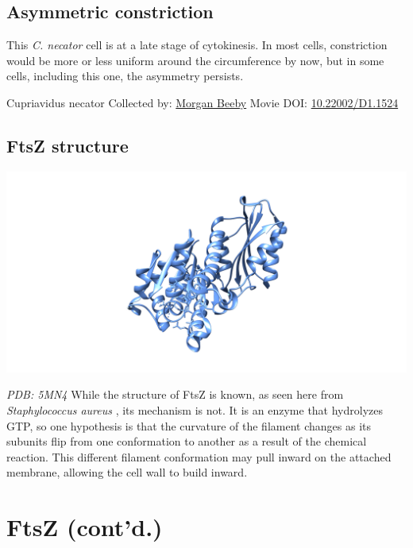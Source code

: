 \documentclass[]{tufte-book}
\begin{document}
\hypertarget{Asymmetric_constriction}{%
\subsection{Asymmetric constriction}\label{Asymmetric_constriction}}

This \emph{C. necator} cell is at a late stage of cytokinesis. In most cells, constriction would be more or less uniform around the circumference by now, but in some cells, including this one, the asymmetry persists.



\hypertarget{htmlwidget-9a9023a9fe3648c17818}{}

\label{fig:5-9a}Cupriavidus necator Collected by: \protect\hyperlink{morgan_beeby}{Morgan Beeby} Movie DOI: \href{https://doi.org/10.22002/D1.1524}{10.22002/D1.1524}

\hypertarget{FtsZ_structure}{%
\subsection{FtsZ structure}\label{FtsZ_structure}}

\includegraphics{img/schematics/5_9_1}

\emph{PDB: 5MN4}
While the structure of FtsZ is known, as seen here from \emph{Staphylococcus aureus} \citep{wagstaff2017}, its mechanism is not. It is an enzyme that hydrolyzes GTP, so one hypothesis is that the curvature of the filament changes as its subunits flip from one conformation to another as a result of the chemical reaction. This different filament conformation may pull inward on the attached membrane, allowing the cell wall to build inward.

\hypertarget{ftsz-contd.}{%
\section{FtsZ (cont'd.)}\label{ftsz-contd.}}
\end{document}
